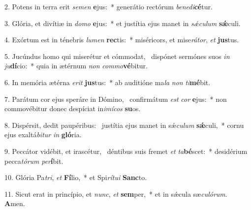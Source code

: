 2. Potens in terra erit \textit{se}\textit{men} \textbf{e}jus:~*  generátio rectórum \textit{be}\textit{ne}\textit{di}\textbf{cé}tur.\

3. Glória, et divítiæ in \textit{do}\textit{mo} \textbf{e}jus:~*  et justítia ejus manet in \textit{sǽ}\textit{cu}\textit{lum} \textbf{sǽ}culi.\

4. Exórtum est in ténebris \textit{lu}\textit{men} \textbf{rec}tis:~*  miséricors, et mise\textit{rá}\textit{tor}, \textit{et} \textbf{jus}tus.\

5. Jucúndus homo qui miserétur et cómmodat, \dag\  dispónet sermónes suos \textit{in} \textit{ju}\textbf{dí}cio:~*  quia in ætérnum \textit{non} \textit{com}\textit{mo}\textbf{vé}bitur.\

6. In memória ætérna \textit{e}\textit{rit} \textbf{jus}tus:~*  ab auditióne ma\textit{la} \textit{non} \textit{ti}\textbf{mé}bit.\

7. Parátum cor ejus speráre in Dómino, \dag\  confirmátum \textit{est} \textit{cor} \textbf{e}jus:~*  non commovébitur donec despíciat in\textit{i}\textit{mí}\textit{cos} \textbf{su}os.\

8. Dispérsit, dedit paupéribus: \dag\  justítia ejus manet in sǽ\textit{cu}\textit{lum} \textbf{sǽ}culi,~*  cornu ejus exaltá\textit{bi}\textit{tur} \textit{in} \textbf{gló}ria.\

9. Peccátor vidébit, et irascétur, \dag\  déntibus suis fremet \textit{et} \textit{ta}\textbf{bé}scet:~*  desidérium pecca\textit{tó}\textit{rum} \textit{per}\textbf{í}bit.\

10. Glória Pa\textit{tri}, \textit{et} \textbf{Fí}lio,~*  et Spi\textit{rí}\textit{tu}\textit{i} \textbf{Sanc}to.\

11. Sicut erat in princípio, et \textit{nunc}, \textit{et} \textbf{sem}per,~*  et in sǽcula sæ\textit{cu}\textit{ló}\textit{rum}. \textbf{A}men.\

